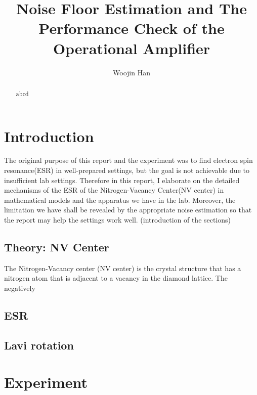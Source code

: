 \documentclass{article}
\begin{document}
\title{Noise Floor Estimation and The Performance Check of the Operational Amplifier}
\author[1]{Woojin Han}
\maketitle

\begin{abstract}
    abcd
\end{abstract}

\section{Introduction}
The original purpose of this report and the experiment was to find electron spin resonance(ESR) in well-prepared settings, but the goal is not achievable due to insufficient lab settings.
Therefore in this report, I elaborate on the detailed mechanisms of the ESR of the Nitrogen-Vacancy Center(NV center) in mathematical models and the apparatus we have in the lab.
Moreover, the limitation we have shall be revealed by the appropriate noise estimation so that the report may help the settings work well.
(introduction of the sections)

\subsection{Theory: NV Center}
The Nitrogen-Vacancy center (NV center) is the crystal structure that has a nitrogen atom that is adjacent to a vacancy in the diamond lattice.
The negatively
\cite{nv} %
\cite{nvphonon} %
\subsection{ESR}

\subsection{Lavi rotation}

\section{Experiment}




\end{document}
